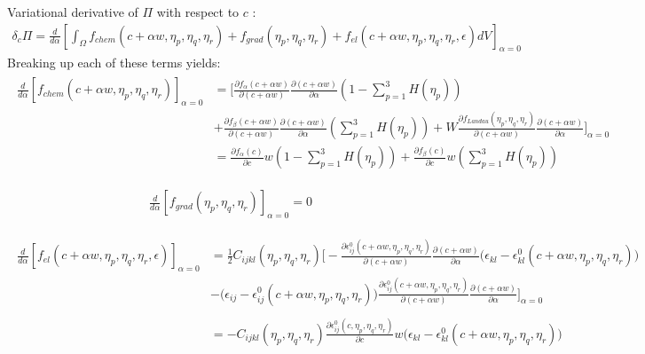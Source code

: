 \documentclass[11pt]{article}
\renewcommand{\=}[1]{\stackrel{#1}{=}} %
\theoremstyle{definition}
\theoremstyle{remark}
\begin{document}
Variational derivative of $\Pi$ with respect to $c$ :
\begin{gather}
\delta_{c} \Pi  =  \frac{d}{d\alpha} \left[\int_{\Omega}  f_{chem}(c+\alpha w,\eta_p,\eta_q,\eta_r) + f_{grad}(\eta_p,\eta_q,\eta_r) + f_{el}(c+\alpha w,\eta_p,\eta_q,\eta_r,\epsilon) dV  \right]_{\alpha=0}
\end{gather}
Breaking up each of these terms yields:
\begin{align}
\begin{split}
\frac{d}{d\alpha} \left[ f_{chem}(c+\alpha w,\eta_p,\eta_q,\eta_r)\right]_{\alpha=0}  &= \bigg[ \frac{\partial f_{\alpha}(c + \alpha w)}{\partial(c+\alpha w)} \frac{\partial(c+\alpha w)}{\partial \alpha} \left(1-\sum_{p=1}^3 H(\eta_p)\right) \\
&+ \frac{\partial f_{\beta}(c+\alpha w)}{\partial(c+\alpha w)} \frac{\partial(c+\alpha w)}{\partial \alpha} \left(\sum_{p=1}^3 H(\eta_p)\right) + W \frac{\partial f_{Landau}(\eta_p,\eta_q,\eta_r)}{\partial(c+\alpha w)} \frac{\partial(c+\alpha w)}{\partial \alpha} \bigg]_{\alpha=0}
\\
&= \frac{\partial f_{\alpha}(c)}{\partial c} w \left(1-\sum_{p=1}^3 H(\eta_p)\right) +\frac{\partial f_{\beta}(c)}{\partial c} w \left(\sum_{p=1}^3 H(\eta_p)\right)
\end{split}
\end{align}

\begin{align}
\frac{d}{d\alpha} \left[ f_{grad}(\eta_p,\eta_q,\eta_r)\right]_{\alpha=0} = 0
\end{align}

\begin{align}
\begin{split}
\frac{d}{d\alpha} \left[ f_{el}(c+\alpha w,\eta_p,\eta_q,\eta_r,\epsilon)\right]_{\alpha=0} &= \frac{1}{2} C_{ijkl}(\eta_p,\eta_q,\eta_r)  \bigg[ -\frac{\partial \epsilon_{ij}^0 (c+\alpha w,\eta_p,\eta_q,\eta_r)}{\partial (c + \alpha w)} \frac{\partial(c + \alpha w)}{\partial \alpha} \big(\epsilon_{kl}-\epsilon_{kl}^0 (c+\alpha w,\eta_p,\eta_q,\eta_r)\big)  \\ 
&- \big(\epsilon_{ij}-\epsilon_{ij}^0 (c+\alpha w,\eta_p,\eta_q,\eta_r)\big) \frac{\partial \epsilon_{ij}^0 (c+\alpha w,\eta_p,\eta_q,\eta_r)}{\partial (c + \alpha w)} \frac{\partial(c + \alpha w)}{\partial \alpha} \bigg]_{\alpha=0} \\
\\
&= -C_{ijkl}(\eta_p,\eta_q,\eta_r) \frac{\partial \epsilon_{ij}^0 (c,\eta_p,\eta_q,\eta_r)}{\partial c} w \big(\epsilon_{kl}-\epsilon_{kl}^0 (c+\alpha w,\eta_p,\eta_q,\eta_r)\big)
\end{split}
\end{align}
\end{document}
